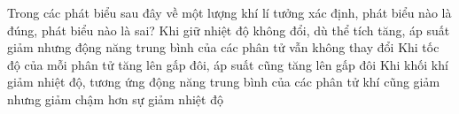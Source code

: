 \begin{ex}
	Trong các phát biểu sau đây về một lượng khí lí tưởng xác định, phát biểu nào là đúng, phát biểu nào là sai?
	{\True Khi giữ nhiệt độ không đổi, dù thể tích tăng, áp suất giảm nhưng động năng trung bình của các phân tử vẫn không thay đổi}
	{Khi tốc độ của mỗi phân tử tăng lên gấp đôi, áp suất cũng tăng lên gấp đôi}
	{Khi khối khí giảm nhiệt độ, tương ứng động năng trung bình của các phân tử khí cũng giảm nhưng giảm chậm hơn sự giảm nhiệt độ}
	\loigiai{
		
	}
\end{ex}



